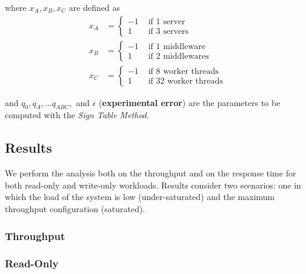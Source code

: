 \documentclass[11pt,a4paper]{article}
\begin{document}
where $x_A, x_B, x_C$ are defined as\\
\begin{align*}
x_A &= 
\begin{cases}
    -1 & \text{ if 1 server}\\
    1 & \text{ if 3 servers}
\end{cases}
\\
x_B &=
\begin{cases}
    -1 & \text{ if 1 middleware}\\
    1 & \text{ if 2 middlewares}
\end{cases}
\\
x_C &=
\begin{cases}
    -1 & \text{ if 8 worker threads}\\
    1 & \text{ if 32 worker threads}
\end{cases}
\end{align*}

and $q_0, q_A, \dots q_{ABC},$ and $\epsilon$ (\textbf{experimental error}) are the parameters to be computed with the \textit{Sign Table Method}.

\subsection{Results}

We perform the analysis both on the throughput and on the response time for both read-only and write-only workloads. Results consider two scenarios: one in which the load of the system is low (under-saturated) and the maximum throughput configuration (saturated).

\subsubsection*{Throughput}

\subsubsection*{Read-Only}
\end{document}
